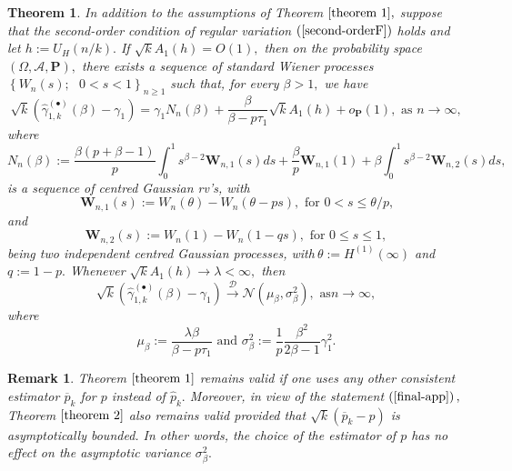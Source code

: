 \documentclass[reqno,openbib,runningheads,a4paper,12pt]{amsart}%
\newtheorem{theorem}{Theorem}[section]
\newtheorem{remark}{Remark}[section]
\begin{document}
\begin{theorem}
\textbf{\label{theorem 2}}In addition to the assumptions of Theorem
$\ref{theorem 1},$ suppose that the second-order condition of regular
variation $\left(  \ref{second-orderF}\right)  $ holds and let $h:=U_{H}%
\left(  n/k\right)  .$ If $\sqrt{k}A_{1}\left(  h\right)  =O\left(  1\right)
,$ then on the probability space $\left(  \Omega,\mathcal{A},\mathbf{P}%
\right)  ,$ there exists a sequence of standard Wiener processes $\left\{
W_{n}\left(  s\right)  ;\text{ }0<s<1\right\}  _{n\geq1}$ such that, for every
$\beta>1,$ we have%
\[
\sqrt{k}\left(  \widehat{\gamma}_{1,k}^{\left(  \bullet\right)  }\left(
\beta\right)  -\gamma_{1}\right)  =\gamma_{1}N_{n}\left(  \beta\right)
+\frac{\beta}{\beta-p\tau_{1}}\sqrt{k}A_{1}\left(  h\right)  +o_{\mathbf{P}%
}\left(  1\right)  ,\text{ as }n\rightarrow\infty,
\]
where%
\begin{equation}
N_{n}\left(  \beta\right)  :=\frac{\beta\left(  p+\beta-1\right)  }{p}\int%
_{0}^{1}s^{\beta-2}\mathbf{W}_{n,1}\left(  s\right)  ds+\frac{\beta}%
{p}\mathbf{W}_{n,1}\left(  1\right)  +\beta\int_{0}^{1}s^{\beta-2}%
\mathbf{W}_{n,2}\left(  s\right)  ds, \label{Gaussian-app}%
\end{equation}
is a sequence of centred Gaussian rv's, with%
\[
\mathbf{W}_{n,1}\left(  s\right)  :=W_{n}\left(  \theta\right)  -W_{n}\left(
\theta-ps\right)  ,\text{ for }0<s\leq\theta/p\text{,}%
\]
and%
\[
\mathbf{W}_{n,2}\left(  s\right)  :=W_{n}\left(  1\right)  -W_{n}\left(
1-qs\right)  ,\text{ for }0\leq s\leq1,
\]
being two independent centred Gaussian processes, with$\ \theta:=H^{\left(
1\right)  }\left(  \infty\right)  $ and $q:=1-p.$ Whenever $\sqrt{k}%
A_{1}\left(  h\right)  \rightarrow\lambda<\infty,$ then%
\begin{equation}
\sqrt{k}\left(  \widehat{\gamma}_{1,k}^{\left(  \bullet\right)  }\left(
\beta\right)  -\gamma_{1}\right)  \overset{\mathcal{D}}{\rightarrow
}\mathcal{N}\left(  \mu_{\beta},\sigma_{\beta}^{2}\right)  ,\text{ as
}n\rightarrow\infty, \label{normality}%
\end{equation}
where%
\[
\mu_{\beta}:=\frac{\lambda\beta}{\beta-p\tau_{1}}\text{ and }\sigma_{\beta
}^{2}:=\frac{1}{p}\frac{\beta^{2}}{2\beta-1}\gamma_{1}^{2}.
\]

\end{theorem}

\begin{remark}
Theorem $\ref{theorem 1}$ remains valid if one uses any other consistent
estimator $\overline{p}_{k}$ for $p$ instead of $\widehat{p}_{k}.$ Moreover,
in view of the statement $\left(  \ref{final-app}\right)  ,$ Theorem
$\ref{theorem 2}$ also remains valid provided that $\sqrt{k}\left(
\overline{p}_{k}-p\right)  $ is asymptotically bounded. In other words, the
choice of the estimator of $p$ has no effect on the asymptotic variance
$\sigma_{\beta}^{2}.$
\end{remark}
\end{document}
